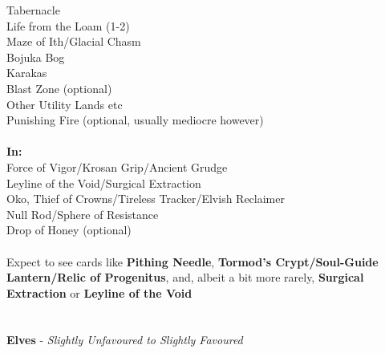 \documentclass{report}
\begin{document}
Tabernacle\\Life from the Loam (1-2)\\Maze of Ith/Glacial Chasm\\Bojuka Bog\\Karakas\\Blast Zone (optional)\\Other Utility Lands etc\\Punishing Fire (optional, usually mediocre however)\\\\
\textbf{In:}\\
Force of Vigor/Krosan Grip/Ancient Grudge\\Leyline of the Void/Surgical Extraction\\Oko, Thief of Crowns/Tireless Tracker/Elvish Reclaimer\\Null Rod/Sphere of Resistance\\Drop of Honey (optional)\\\\
Expect to see cards like \textbf{Pithing Needle}, \textbf{Tormod's Crypt/Soul-Guide Lantern/Relic of Progenitus}, and, albeit a bit more rarely, \textbf{Surgical Extraction} or \textbf{Leyline of the Void}\\\\\\
\textbf{Elves} - \emph{Slightly Unfavoured to Slightly Favoured}\\
\end{document}

